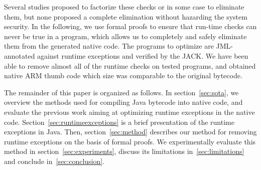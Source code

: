 Several studies proposed to factorize these checks or in some case to eliminate them, but none proposed a complete elimination without hazarding the system security.
 In the following, we use formal proofs to ensure that run-time checks can never be true in a program, which allows us to completely and safely eliminate them from the generated native code.
 The programs to optimize are JML-annotated against runtime exceptions and verified by the JACK. We have been able to remove almost all of the runtime 
 checks on tested programs, and obtained native ARM thumb code which size was comparable to the original bytecode.

The remainder of this paper is organized as follows. In section~\ref{sec:sota}, we overview the methods used for compiling Java bytecode into native code,
 and evaluate the previous work aiming at optimizing runtime exceptions in the native code. Section~\ref{sec:runtimeexceptions} is a brief presentation 
of the runtime exceptions in Java. 
Then, section~\ref{sec:method} describes our method for removing runtime exceptions on the basis of formal proofs. We experimentally evaluate this method in 
section~\ref{sec:experiments}, discuss its limitations in~\ref{sec:limitations} and conclude in~\ref{sec:conclusion}.
